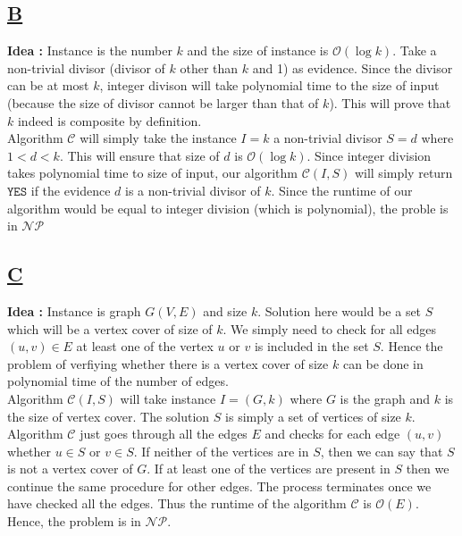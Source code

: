 \documentclass[14pt]{article}
\begin{document}
		\subsection*{\underline{B}}
			\noindent
			\newline
			\textbf{Idea : }Instance is the number $k$ and the size of instance is $\mathcal{O}(\log k)$. Take a non-trivial divisor (divisor of $k$ other than $k$ and 1) as evidence. Since the divisor can be at most $k$, integer divison will take polynomial time to the size of input (because the size of divisor cannot be larger than that of $k$). This will prove that $k$ indeed is composite by definition.\\
			\newline
			Algorithm $\mathcal{C}$ will simply take the instance $I = k$ a non-trivial divisor $S = d$ where $1 < d < k$. This will ensure that size of $d$ is $\mathcal{O}(\log k)$. Since integer division takes polynomial time to size of input, our algorithm $\mathcal{C}(I, S)$ will simply return $\mathtt{YES}$ if the evidence $d$ is a non-trivial divisor of $k$. Since the runtime of our algorithm would be equal to integer division (which is polynomial), the proble is in $\mathcal{NP}$\\
			\newline 
			
		\newpage
		
		\subsection*{\underline{C}}
			\noindent
			\newline
			\textbf{Idea : }Instance is graph $G(V, E)$ and size $k$. Solution here would be a set $S$ which will be a vertex cover of size of $k$. We simply need to check for all edges $(u, v) \in E$ at least one of the vertex $u$ or $v$ is included in the set $S$. Hence the problem of verfiying whether there is a vertex cover of size $k$ can be done in polynomial time of the number of edges.\\
			\newline
			Algorithm $\mathcal{C}(I, S)$ will take instance $I = (G, k)$ where $G$ is the graph and $k$ is the size of vertex cover. The solution $S$ is simply a set of vertices of size $k$. Algorithm $\mathcal{C}$ just goes through all the edges $E$ and checks for each edge $(u, v)$ whether $u \in S$ or $v \in S$. If neither of the vertices are in $S$, then we can say that $S$ is not a vertex cover of $G$. If at least one of the vertices are present in $S$ then we continue the same procedure for other edges. The process terminates once we have checked all the edges. Thus the runtime of the algorithm $\mathcal{C}$ is $\mathcal{O}(E)$. Hence, the problem is in $\mathcal{NP}$. 
			
\end{document}
